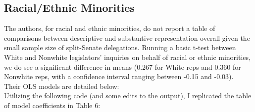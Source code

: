 \documentclass[12pt,letterpaper]{article}
\begin{document}
	\subsection{Racial/Ethnic Minorities}
	
	The authors, for racial and ethnic minorities, do not report a table of comparisons between descriptive and substantive representation overall given the small sample size of split-Senate delegations. Running a basic t-test between White and Nonwhite legislators' inquiries on behalf of racial or ethnic minorities, we do see a significant difference in means (0.267 for White reps and 0.360 for Nonwhite reps, with a confidence interval ranging between -0.15 and -0.03). \\
	
			
	
	Their OLS models are detailed below:\\
	
		
		
	Utilizing the following code (and some edits to the output), I replicated the table of model coefficients in Table 6:\\
	
			
\end{document}
